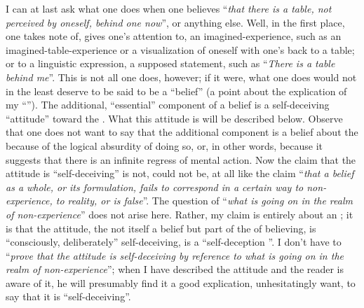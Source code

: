 I can at last ask what one does when one believes \enquote{\emph{that there is a table, 
not perceived by oneself, behind one now}}, or anything else. Well, in the 
first place, one takes note of, gives one's attention to, an 
imagined-experience, such as an imagined-table-experience or a visualization 
of oneself with one's back to a table; or to a linguistic expression, a supposed 
statement, such as \enquote{\emph{There is a table behind me}}. This is not all one does, 
however; if it were, what one does would not in the least deserve to be said 
to be a \enquote{belief} (a point about the explication of my \enquote{}). The 
additional, \enquote{essential} component of a belief is a self-deceiving \enquote{attitude} 
toward the . What this attitude is will be described below. Observe 
that one does not want to say that the additional component is a belief 
about the  because of the logical absurdity of doing so, or, in 
other words, because it suggests that there is an infinite regress of mental 
action. Now the claim that the attitude is \enquote{self-deceiving} is not, could not 
be, at all like the claim \enquote{\emph{that a belief as a whole, or its formulation, fails to 
correspond in a certain way to non-experience, to reality, or is false}}. The 
question of \enquote{\emph{what is going on in the realm of non-experience}} does not arise 
here. Rather, my claim is entirely about an ; it is that the attitude, 
the  not itself a belief but part of the  of believing, is 
\enquote{consciously, deliberately} self-deceiving, is a \enquote{self-deception }. I 
don't have to \enquote{\emph{prove that the attitude is self-deceiving by reference to what 
is going on in the realm of non-experience}}; when I have described the 
attitude and the reader is aware of it, he will presumably find it a good 
explication, unhesitatingly want, to say that it is \enquote{self-deceiving}. 

